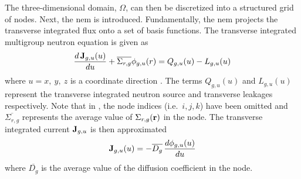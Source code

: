     The three-dimensional domain, $\Omega$, can then be discretized into a
    structured grid of nodes. Next, the \gls{nem} is introduced. Fundamentally,
    the \gls{nem} projects the transverse integrated flux onto a set of basis
    functions. The transverse integrated multigroup neutron equation is given as
    \begin{equation}
      \label{eq:transverse_multigroup_diffusion}
      \frac{d \, \mathbf{J}_{g,u} (u)}{d u} + \overline{\Sigma_{r,g}}
        \phi_{g,u}(r) = Q_{g,u}(u) - L_{g,u}(u)
    \end{equation}
    where $u = x,\ y,\ z$ is a coordinate direction \cite{qe2paper}. The terms 
    $Q_{g,u}(u)$ and $L_{g,u}(u)$ represent the transverse integrated neutron
    source and transverse leakages respectively. Note that in
    , the node indices
    (i.e.~$i,j,k$) have been omitted and $\overline{\Sigma_{r,g}}$ represents
    the average value of $\Sigma_{r,g}(\mathbf{r})$ in the node. The transverse
    integrated current $\mathbf{J}_{g,u}$ is then approximated
    \begin{equation}
      \label{eq:current_approximation}
      \mathbf{J}_{g,u}(u) = - \overline{D_g} \, \frac{d \phi_{g,u}(u)}{du}
    \end{equation}
    where $\overline{D_g}$ is the average value of the diffusion coefficient in
    the node.

